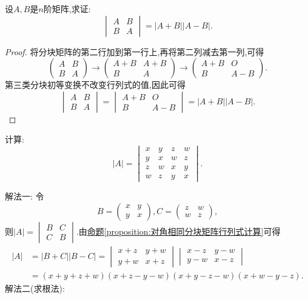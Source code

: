 \documentclass[../../main.tex]{subfiles}
\begin{document}
\begin{proposition}\label{proposition:对角相同分块矩阵行列式计算}
设\(A,B\)是\(n\)阶矩阵,求证:
\[
\begin{vmatrix}
A & B\\
B & A
\end{vmatrix}=|A + B||A - B|.
\]
\end{proposition}
\begin{proof}
将分块矩阵的第二行加到第一行上,再将第二列减去第一列,可得
\[
\begin{pmatrix}
A & B\\
B & A
\end{pmatrix}\to\begin{pmatrix}
A + B & A + B\\
B & A
\end{pmatrix}\to\begin{pmatrix}
A + B & O\\
B & A - B
\end{pmatrix}.
\]
第三类分块初等变换不改变行列式的值,因此可得
\[
\begin{vmatrix}
A & B\\
B & A
\end{vmatrix}=\begin{vmatrix}
A + B & O\\
B & A - B
\end{vmatrix}=|A + B||A - B|.
\]
\end{proof}

\begin{example}
计算:
\[
|A| = 
\begin{vmatrix}
x & y & z & w\\
y & x & w & z\\
z & w & x & y\\
w & z & y & x
\end{vmatrix}.
\]
\end{example}
\begin{solution}
{\color{blue}解法一:}
令
\[
B = 
\begin{pmatrix}
x & y\\
y & x
\end{pmatrix},
C = 
\begin{pmatrix}
z & w\\
w & z
\end{pmatrix},
\]
则\(|A| = 
\begin{vmatrix}
B & C\\
C & B
\end{vmatrix}\).由\hyperref[proposition:对角相同分块矩阵行列式计算]{命题\ref{proposition:对角相同分块矩阵行列式计算}}可得
\begin{align*}
|A|&=|B + C||B - C|
=\begin{vmatrix}
x + z & y + w\\
y + w & x + z
\end{vmatrix}\begin{vmatrix}
x - z & y - w\\
y - w & x - z
\end{vmatrix}\\
&=(x + y + z + w)(x + z - y - w)(x + y - z - w)(x + w - y - z).
\end{align*}
{\color{blue}解法二(求根法):}
\end{solution}
\end{document}
